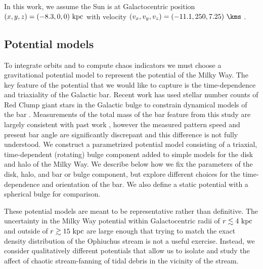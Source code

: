 \documentclass[letterpaper,12pt,preprint]{aastex}
\begin{document}
In this work, we assume the Sun is at Galactocentric position $(x,y,z) = (-8.3,0,0)~{\rm kpc}$ \citep[e.g.,][]{schoenrich12} with velocity $(v_x,v_y,v_z) = (-11.1, 250, 7.25)~\kms$ \citep[e.g.,][]{schoenrich10, schoenrich12}.

\subsection{Potential models}\label{sec:potential}

To integrate orbits and to compute chaos indicators we must choose a gravitational potential model to represent the potential of the Milky Way. The key feature of the potential that we would like to capture is the time-dependence and triaxiality of the Galactic bar. Recent work has used stellar number counts of Red Clump giant stars in the Galactic bulge to constrain dynamical models of the bar \citep{portail15}. Measurements of the total mass of the bar feature from this study are largely consistent with past work \citep[e.g.,][]{wang12}, however the measured pattern speed and present bar angle are significantly discrepant and this difference is not fully understood. We construct a parametrized potential model consisting of a triaxial, time-dependent (rotating) bulge component added to simple models for the disk and halo of the Milky Way. We describe below how we fix the parameters of the disk, halo, and bar or bulge component, but explore different choices for the time-dependence and orientation of the bar. We also define a static potential with a spherical bulge for comparison. 

These potential models are meant to be representative rather than definitive. The uncertainty in the Milky Way potential within Galactocentric radii of $r\lesssim 4~{\rm kpc}$ and outside of $r\gtrsim 15~{\rm kpc}$ are large enough that trying to match the exact density distribution of the Ophiuchus stream is not a useful exercise. Instead, we consider qualitatively different potentials that allow us to isolate and study the affect of chaotic stream-fanning of tidal debris in the vicinity of the stream. 
\end{document}
